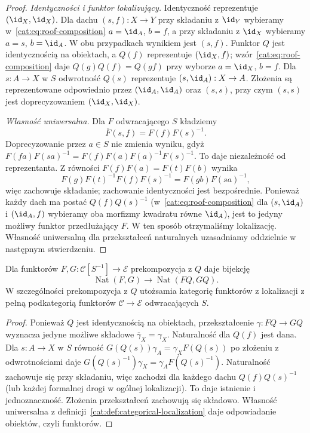 \begin{proof}
\emph{Identyczności i funktor lokalizujący.} Identyczność reprezentuje $(\id_X,\id_X)$. Dla dachu $(s,f):X\to Y$ przy składaniu z $\id_Y$ wybieramy w~\eqref{cat:eq:roof-composition} $a=\id_A$, $b=f$, a przy składaniu z $\id_X$ wybieramy $a=s$, $b=\id_A$. W obu przypadkach wynikiem jest $(s,f)$. Funktor $Q$ jest identycznością na obiektach, a $Q(f)$ reprezentuje $(\id_X,f)$; wzór~\eqref{cat:eq:roof-composition} daje $Q(g)Q(f)=Q(gf)$ przy wyborze $a=\id_X$, $b=f$. Dla $s:A\to X$ w $S$ odwrotność $Q(s)$ reprezentuje $(s,\id_A):X\to A$. Złożenia są reprezentowane odpowiednio przez $(\id_A,\id_A)$ oraz $(s,s)$, przy czym $(s,s)$ jest doprecyzowaniem $(\id_X,\id_X)$.

\emph{Własność uniwersalna.} Dla $F$ odwracającego $S$ kładziemy
\[
 \overline F(s,f)=F(f)F(s)^{-1}.
\]
Doprecyzowanie przez $a\in S$ nie zmienia wyniku, gdyż $F(fa)F(sa)^{-1}=F(f)F(a)F(a)^{-1}F(s)^{-1}$. To daje niezależność od reprezentanta. Z równości $F(f)F(a)=F(t)F(b)$ wynika
\[
 F(g)F(t)^{-1}F(f)F(s)^{-1}
 =F(gb)F(sa)^{-1},
\]
więc zachowuje składanie; zachowanie identyczności jest bezpośrednie. Ponieważ każdy dach ma postać $Q(f)Q(s)^{-1}$ (w~\eqref{cat:eq:roof-composition} dla $(s,\id_A)$ i $(\id_A,f)$ wybieramy oba morfizmy kwadratu równe $\id_A$), jest to jedyny możliwy funktor przedłużający $F$. W ten sposób otrzymaliśmy lokalizację. Własność uniwersalną dla przekształceń naturalnych uzasadniamy oddzielnie w następnym stwierdzeniu.
\end{proof}
\begin{stwierdzenie}\label{cat:prop:localization-natural-transformations}
Dla funktorów $F,G:\mathcal C[S^{-1}]\to\mathcal E$ prekompozycja z $Q$ daje bijekcję
\[
 \operatorname{Nat}(F,G)\longrightarrow\operatorname{Nat}(FQ,GQ).
\]
W szczególności prekompozycja z $Q$ utożsamia kategorię funktorów z lokalizacji z pełną podkategorią funktorów $\mathcal C\to\mathcal E$ odwracających $S$.
\end{stwierdzenie}
\begin{proof}
Ponieważ $Q$ jest identycznością na obiektach, przekształcenie $\gamma:FQ\to GQ$ wyznacza jedyne możliwe składowe $\overline\gamma_X=\gamma_X$. Naturalność dla $Q(f)$ jest dana. Dla $s:A\to X$ w $S$ równość $G(Q(s))\gamma_A=\gamma_XF(Q(s))$ po złożeniu z odwrotnościami daje $G(Q(s)^{-1})\gamma_X=\gamma_AF(Q(s)^{-1})$. Naturalność zachowuje się przy składaniu, więc zachodzi dla każdego dachu $Q(f)Q(s)^{-1}$ (lub każdej formalnej drogi w ogólnej lokalizacji). To daje istnienie i jednoznaczność. Złożenia przekształceń zachowują się składowo. Własność uniwersalna z definicji~\ref{cat:def:categorical-localization} daje odpowiadanie obiektów, czyli funktorów.
\end{proof}
